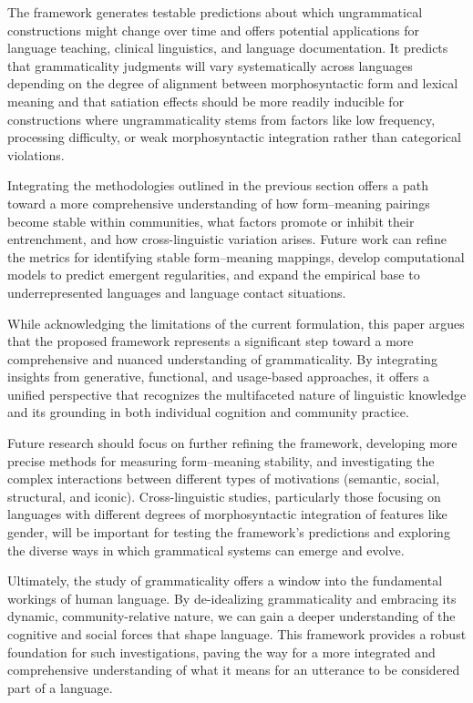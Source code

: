 \documentclass[12pt,letterpaper]{article}
\begin{document}
The framework generates testable predictions about which ungrammatical constructions might change over time and offers potential applications for language teaching, clinical linguistics, and language documentation. It predicts that grammaticality judgments will vary systematically across languages depending on the degree of alignment between morphosyntactic form and lexical meaning and that satiation effects should be more readily inducible for constructions where ungrammaticality stems from factors like low frequency, processing difficulty, or weak morphosyntactic integration rather than categorical violations.

Integrating the methodologies outlined in the previous section offers a path toward a more comprehensive understanding of how form--meaning pairings become stable within communities, what factors promote or inhibit their entrenchment, and how cross-linguistic variation arises. Future work can refine the metrics for identifying stable form--meaning mappings, develop computational models to predict emergent regularities, and expand the empirical base to underrepresented languages and language contact situations.

While acknowledging the limitations of the current formulation, this paper argues that the proposed framework represents a significant step toward a more comprehensive and nuanced understanding of grammaticality. By integrating insights from generative, functional, and usage-based approaches, it offers a unified perspective that recognizes the multifaceted nature of linguistic knowledge and its grounding in both individual cognition and community practice.

Future research should focus on further refining the framework, developing more precise methods for measuring form--meaning stability, and investigating the complex interactions between different types of motivations (semantic, social, structural, and iconic). Cross-linguistic studies, particularly those focusing on languages with different degrees of morphosyntactic integration of features like gender, will be important for testing the framework's predictions and exploring the diverse ways in which grammatical systems can emerge and evolve.

Ultimately, the study of grammaticality offers a window into the fundamental workings of human language. By de-idealizing grammaticality and embracing its dynamic, community-relative nature, we can gain a deeper understanding of the cognitive and social forces that shape language. This framework provides a robust foundation for such investigations, paving the way for a more integrated and comprehensive understanding of what it means for an utterance to be considered part of a language.
\end{document}
